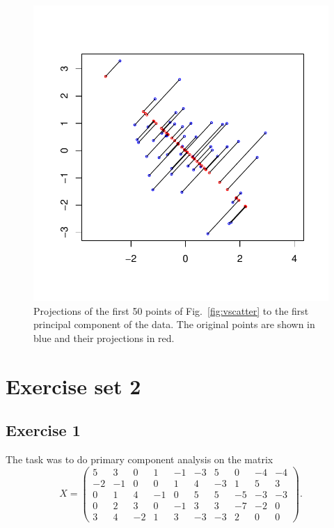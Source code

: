 \documentclass{article}
\begin{document}
\begin{figure} \centering
	\includegraphics[scale=0.7]{proj}
	\caption{Projections of the first 50 points of Fig.~\ref{fig:vscatter} to the first principal component of the data. The original points are shown in blue and their projections in red.} \label{fig:proj}
\end{figure}


\clearpage
\section{Exercise set 2}
\newcommand{\X}{\ensuremath{\mathbf{X}}}
\subsection{Exercise 1}
The task was to do primary component analysis on the matrix
$$ X =
\begin{pmatrix}
	5 & 3 & 0 & 1 & -1 & -3 & 5 & 0 & -4 & -4 \\
	-2 & -1 & 0 & 0 & 1 & 4 & -3 & 1 & 5 & 3 \\
	0 & 1 & 4 & -1 & 0 & 5 & 5 & -5 & -3 & -3 \\
	0 & 2 & 3 & 0 & -1 & 3 & 3 & -7 & -2 & 0 \\
	3 & 4 & -2 & 1 & 3 & -3 & -3 & 2 & 0 & 0
\end{pmatrix}.
$$
\end{document}
